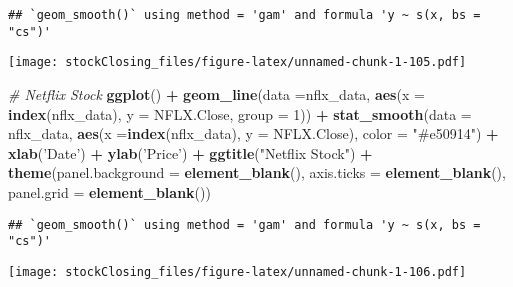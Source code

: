 \documentclass[]{article}
\newenvironment{Shaded}{\begin{snugshade}}{\end{snugshade}}
\newcommand{\CommentTok}[1]{\textcolor[rgb]{0.56,0.35,0.01}{\textit{#1}}}
\newcommand{\DataTypeTok}[1]{\textcolor[rgb]{0.13,0.29,0.53}{#1}}
\newcommand{\DecValTok}[1]{\textcolor[rgb]{0.00,0.00,0.81}{#1}}
\newcommand{\KeywordTok}[1]{\textcolor[rgb]{0.13,0.29,0.53}{\textbf{#1}}}
\newcommand{\NormalTok}[1]{#1}
\newcommand{\OperatorTok}[1]{\textcolor[rgb]{0.81,0.36,0.00}{\textbf{#1}}}
\newcommand{\StringTok}[1]{\textcolor[rgb]{0.31,0.60,0.02}{#1}}
\begin{document}
\begin{verbatim}
## `geom_smooth()` using method = 'gam' and formula 'y ~ s(x, bs = "cs")'
\end{verbatim}

\texttt{[image: stockClosing\_files/figure-latex/unnamed-chunk-1-105.pdf]}

\begin{Shaded}
\begin{Highlighting}[]
\CommentTok{# Netflix Stock}
\KeywordTok{ggplot}\NormalTok{() }\OperatorTok{+}
\StringTok{  }\KeywordTok{geom_line}\NormalTok{(}\DataTypeTok{data =}\NormalTok{nflx_data, }\KeywordTok{aes}\NormalTok{(}\DataTypeTok{x =} \KeywordTok{index}\NormalTok{(nflx_data), }\DataTypeTok{y =}\NormalTok{ NFLX.Close, }\DataTypeTok{group =} \DecValTok{1}\NormalTok{)) }\OperatorTok{+}
\StringTok{  }\KeywordTok{stat_smooth}\NormalTok{(}\DataTypeTok{data =}\NormalTok{ nflx_data, }\KeywordTok{aes}\NormalTok{(}\DataTypeTok{x =}\KeywordTok{index}\NormalTok{(nflx_data), }\DataTypeTok{y =}\NormalTok{ NFLX.Close), }\DataTypeTok{color =} \StringTok{"#e50914"}\NormalTok{) }\OperatorTok{+}
\StringTok{  }\KeywordTok{xlab}\NormalTok{(}\StringTok{'Date'}\NormalTok{) }\OperatorTok{+}
\StringTok{  }\KeywordTok{ylab}\NormalTok{(}\StringTok{'Price'}\NormalTok{) }\OperatorTok{+}
\StringTok{  }\KeywordTok{ggtitle}\NormalTok{(}\StringTok{"Netflix Stock"}\NormalTok{) }\OperatorTok{+}
\StringTok{  }\KeywordTok{theme}\NormalTok{(}\DataTypeTok{panel.background =} \KeywordTok{element_blank}\NormalTok{(),}
        \DataTypeTok{axis.ticks =} \KeywordTok{element_blank}\NormalTok{(),}
        \DataTypeTok{panel.grid =} \KeywordTok{element_blank}\NormalTok{())}
\end{Highlighting}
\end{Shaded}

\begin{verbatim}
## `geom_smooth()` using method = 'gam' and formula 'y ~ s(x, bs = "cs")'
\end{verbatim}

\texttt{[image: stockClosing\_files/figure-latex/unnamed-chunk-1-106.pdf]}
\end{document}
